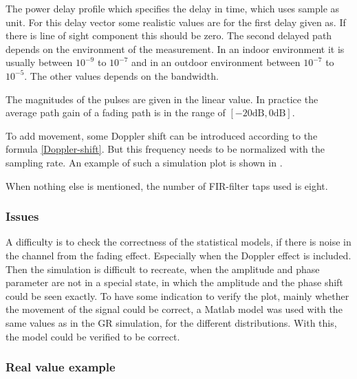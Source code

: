 
The power delay profile which specifies the delay in time, which uses sample as unit. For this delay vector some realistic values are for the first delay \cite{Mathworks} given as. If there is  line of sight component this should be zero. The second delayed path depends on the environment of the measurement. In an indoor environment it is usually between \(10^{-9}\) to \(10^{-7}\) and in an outdoor environment between \(10^{-7}\) to \(10^{-5}\). The other values depends on the bandwidth. 

The magnitudes of the pulses are given in the linear value. In practice the average path gain of a fading path is in the range of \([ -20 \text{dB} , 0\text{dB}]\).

To add movement, some Doppler shift can be introduced according to the formula \eqref{Doppler-shift}. But this frequency needs to be normalized with the sampling rate. 
An example of such a simulation plot is shown in .

When nothing else is mentioned, the number of FIR-filter taps used is eight.


\subsubsection{Issues}

A difficulty is to check the correctness of the statistical models, if there is noise in the channel from the fading effect. Especially when the Doppler effect is included. Then the simulation is difficult to recreate, when the amplitude and phase parameter are not in a special state, in which the amplitude and the phase shift could be seen exactly. 
To have some indication to verify the plot, mainly whether the movement of the signal could be correct, a Matlab model was used with the same values as in the GR simulation, for the different distributions. With this, the model could be verified to be correct.

\subsubsection{Real value example}

